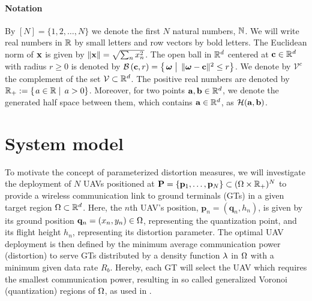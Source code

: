 \documentclass[12pt,onecolumn,journal,draftclsnofoot,letterpaper]{IEEEtran}
\newif\ifarxiv\arxivfalse
\renewcommand{\vq}{\mathbf p}
\renewcommand{\vp}{\mathbf q}
\renewcommand{\vQ}{\mathbf P}
\newcommand{\Ball}{\ensuremath{\mathcal B}}          %
\newcommand{\HS}{\ensuremath{\mathcal{H}}}          %
\newcommand{\Vor}{\ensuremath{\mathcal{V}}}         %
\begin{document}
\paragraph{Notation}  By $[N]=\{1,2,\dots,N\}$ we denote the first $N$ natural numbers, ${\mathbb N}$.  We will
write real numbers in ${\mathbb R}$ by small letters and row vectors by bold letters. The Euclidean norm of ${\mathbf x}$ is given by
$ \left\|{\mathbf x}\right\| =\sqrt{\sum_n x_n^2}$.  The open ball in ${\mathbb R}^d$ centered at ${\mathbf c}\in{\ensuremath{\mathbb R}}^d$ with radius $r\geq 0$ is denoted by
$\Ball\left(\vc,r\right)=\set{\vome}{\|\vome-\vc\|^2\le r}$.
We denote by $\Vor^c$ the complement of the set $\Vor\subset\R^d$. The positive real numbers are denoted by
$\R_+:=\set{a\in\R}{a>0}$.  Moreover, for two points ${\mathbf a},{\mathbf b}\in{\ensuremath{\mathbb R}}^d$, we denote the generated half space between them,
which contains ${\mathbf a}\in{\ensuremath{\mathbb R}}^d$, as $\HS(\va, \vb)$.  

\section{System model}\label{sec:model}
%
To motivate the concept of parameterized distortion measures, we will investigate the deployment of $N$ UAVs positioned at
$\vQ=\{\vq_1,\dots,\vq_N\}\subset(\Ome\times\R_+)^N$ to provide a wireless communication link to ground terminals (GTs) in a
given target region  $\Omega\subset{\ensuremath{\mathbb R}}^d$. Here, the $n$th UAV's position, $\vq_n=(\vp_n,h_n)$, is given by its ground
position $\vp_n=(x_n,y_n)\in\Ome$, representing the quantization point, and its flight height $h_n$, representing its
distortion parameter.  The optimal UAV deployment is then defined by the minimum average
communication power (distortion) to serve GTs distributed by a density function $\lambda$ in $\Omega$ with a
minimum given data rate $R_b$. Hereby, each GT will select the UAV which requires the smallest
communication power, resulting in  so called generalized Voronoi (quantization) regions of $\Omega$,  as used in
\cite{Erdem16,GJ,GJcom18,GJ18,KJ17,ML,MLCS,KKSS18}.  \ifarxiv We also assume that the communication between all users
and UAVs is orthogonal, i.e., separated in frequency or time (slotted protocols).  \fi
\end{document}
